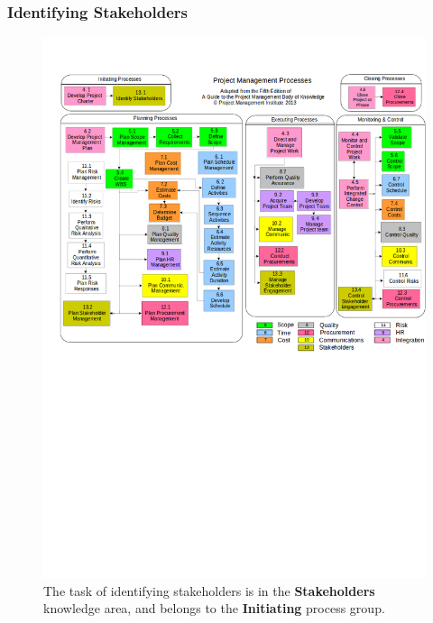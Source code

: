 \documentclass[aspectratio=169]{beamer}
\begin{document}
\begin{frame}
\frametitle{Identifying Stakeholders}
\vspace{-0.5cm}
\begin{figure}
\caption{The task of identifying stakeholders is in the \textbf{Stakeholders} knowledge area, and belongs to the \textbf{Initiating} process group.}
\vspace{-0.8cm}
\includegraphics[scale=0.3]{mapping}
\end{figure}
\end{frame}
\end{document}
